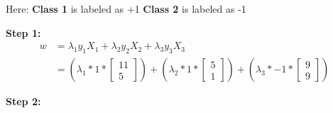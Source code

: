 \documentclass[12pt]{report}
\begin{document}
Here:\newline
\textbf{Class 1} is labeled as +1 \newline
\textbf{Class 2} is labeled as -1

\textbf{Step 1:}\newline\newline
\begin{equation*}
	\begin{aligned}
		w & = \lambda_{1}y_{1}X_{1} + \lambda_{2}y_{2}X_{2} + \lambda_{3}y_{3}X_{3}                                      \\
		  & = (\lambda_{1} * 1 * \begin{bmatrix}
			                         11 \\
			                         5
		                         \end{bmatrix}) + (\lambda_{2} * 1 * \begin{bmatrix}
			                                                             5 \\
			                                                             1
		                                                             \end{bmatrix}) + (\lambda_{3} * -1 * \begin{bmatrix}
			                                                                                                  9 \\
			                                                                                                  9
		                                                                                                  \end{bmatrix})
	\end{aligned}
\end{equation*}

\textbf{Step 2:}
\end{document}
